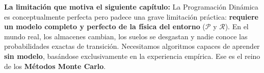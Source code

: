 \begin{notabox}
\textbf{La limitación que motiva el siguiente capítulo:} La Programación Dinámica es conceptualmente perfecta pero padece una grave limitación práctica: \textbf{requiere un modelo completo y perfecto de la física del entorno} ($\mathcal{P}$ y $\mathcal{R}$). En el mundo real, los almacenes cambian, los suelos se desgastan y nadie conoce las probabilidades exactas de transición. Necesitamos algoritmos capaces de aprender \textbf{sin modelo}, basándose exclusivamente en la experiencia empírica. Ese es el reino de los \textbf{Métodos Monte Carlo}.
\end{notabox}
